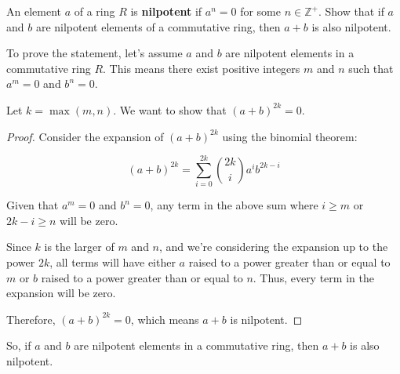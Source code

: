 \documentclass[12pt]{amsart}
\theoremstyle{definition}
\numberwithin{equation}{section}
\theoremstyle{plain}
\newcommand{\Z}{\mathbb{Z}}
\begin{document}
\begin{exercise}{46}
    An element $a$ of a ring $R$ is \textbf{nilpotent} if $a^n = 0$ for some $n \in \Z^+$. 
    Show that if $a$ and $b$ are nilpotent elements of a commutative ring, then $a + b$ is also nilpotent.

    To prove the statement, let's assume \( a \) and \( b \) are nilpotent elements in a commutative ring \( R \). This means there exist positive integers \( m \) and \( n \) such that \( a^m = 0 \) and \( b^n = 0 \).

Let \( k = \max(m, n) \). We want to show that \( (a+b)^{2k} = 0 \).

\begin{proof}
Consider the expansion of \( (a+b)^{2k} \) using the binomial theorem:

\[
(a+b)^{2k} = \sum_{i=0}^{2k} \binom{2k}{i} a^i b^{2k-i}
\]

Given that \( a^m = 0 \) and \( b^n = 0 \), any term in the above sum where \( i \geq m \) or \( 2k-i \geq n \) will be zero. 

Since \( k \) is the larger of \( m \) and \( n \), and we're considering the expansion up to the power \( 2k \), all terms will have either \( a \) raised to a power greater than or equal to \( m \) or \( b \) raised to a power greater than or equal to \( n \). Thus, every term in the expansion will be zero.

Therefore, \( (a+b)^{2k} = 0 \), which means \( a+b \) is nilpotent.
\end{proof}

So, if \( a \) and \( b \) are nilpotent elements in a commutative ring, then \( a+b \) is also nilpotent.

\end{exercise}
\vspace*{20pt}
\end{document}
